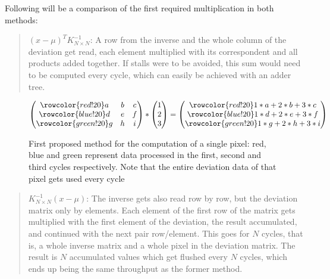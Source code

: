 \newcommand\rb{\colorbox{red!20}}
\newcommand\bb{\colorbox{blue!20}}
\newcommand\gb{\colorbox{green!20}}
\newcommand\rr{\rowcolor{red!20}}
\newcommand\br{\rowcolor{blue!20}}
\newcommand\gr{\rowcolor{green!20}}

\noindent Following will be a comparison of the first required multiplication in both methods:
\begin{quote}
	\((x-\mu)^{T} K^{-1}_{N \times N}\):	
	A row from the inverse and the whole column of the deviation get read, each element multiplied with its correspondent and all products added together. If stalls were to be avoided, this sum would need to be computed every cycle, which can easily be achieved with an adder tree.
\end{quote}

\begin{figure}[h]%
\[
\begin{pmatrix}
\rr a & b & c \\ 
\br d & e & f \\ 
\gr g & h & i
\end{pmatrix}
*
\begin{pmatrix}
1\\
2\\
3
\end{pmatrix}
=
\begin{pmatrix}
\rr 1*a+2*b+3*c\\
\br 1*d+2*e+3*f\\
\gr 1*g+2*h+3*i
\end{pmatrix} 
\]
\caption[Optional: Short caption to appear in List of Figures]{First proposed method for the computation of a single pixel: red, blue and green represent data processed in the first, second and third cycles respectively. Note that the entire deviation data of that pixel gets used every cycle}
\end{figure}
\pagebreak
		
\begin{quote}
	\(K^{-1}_{N \times N} (x-\mu)\):
	The inverse gets also read row by row, but the deviation matrix only by elements. Each element of the first row of the matrix gets multiplied with the first element of the deviation, the result accumulated, and continued with the next pair row/element. This goes for \(N\) cycles, that is, a whole inverse matrix and a whole pixel in the deviation matrix. The result is \(N\) accumulated values which get flushed every \(N\) cycles, which ends up being the same throughput as the former method.
\end{quote}

